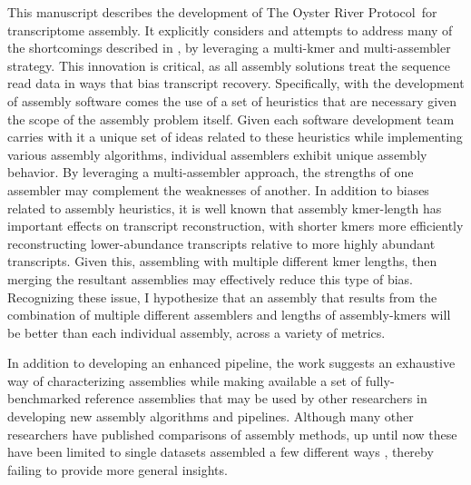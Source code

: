 \documentclass[10pt,letterpaper]{article}
\begin{document}
This manuscript describes the development of The Oyster River Protocol\footnotemark\ for transcriptome assembly. It explicitly considers and attempts to address many of the shortcomings described in \citep{Vijay:2012gy}, by leveraging a multi-kmer and multi-assembler strategy. This innovation is critical, as all assembly solutions treat the sequence read data in ways that bias transcript recovery. Specifically, with the development of assembly software comes the use of a set of heuristics that are necessary given the scope of the assembly problem itself. Given each software development team carries with it a unique set of ideas related to these heuristics while implementing various assembly algorithms, individual assemblers exhibit unique assembly behavior. By leveraging a multi-assembler approach, the strengths of one assembler may complement the weaknesses of another. In addition to biases related to assembly heuristics, it is well known that assembly kmer-length has important effects on transcript reconstruction, with shorter kmers more efficiently reconstructing lower-abundance transcripts relative to more highly abundant transcripts. Given this, assembling with multiple different kmer lengths, then merging the resultant assemblies may effectively reduce this type of bias. Recognizing these issue, I hypothesize that an assembly that results from the combination of multiple different assemblers and lengths of assembly-kmers will be better than each individual assembly, across a variety of metrics. 

In addition to developing an enhanced pipeline, the work suggests an exhaustive way of characterizing assemblies while making available a set of fully-benchmarked reference assemblies that may be used by other researchers in developing new assembly algorithms and pipelines. Although many other researchers have published comparisons of assembly methods, up until now these have been limited to single datasets assembled a few different ways \citep{Marchant:2016hl, Finseth:2014bl}, thereby failing to provide more general insights.     

\end{document}
